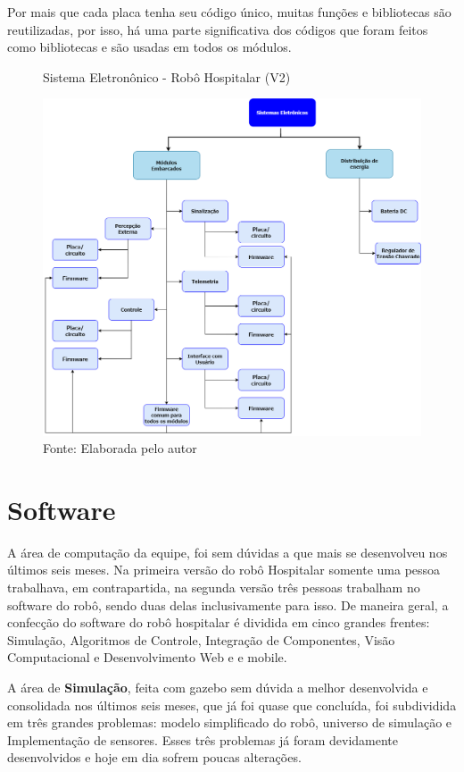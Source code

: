 \documentclass[../poliXuniversity_hospital_(USP)_report.tex]{subfiles}
\begin{document}
Por mais que cada placa tenha seu código único, muitas funções e bibliotecas são reutilizadas, por isso, há uma parte significativa dos códigos que foram feitos como bibliotecas e são usadas em todos os módulos.


\begin{figure}[h]
\centering
    \caption{Sistema Eletronônico - Robô Hospitalar (V2)}
    \centering %
    \includegraphics[width=17cm]{sistema_eletronico.png}
    \caption*{Fonte: Elaborada pelo autor}
    \label{figura:1° Versão Robô Hospitalar}
\end{figure}

\section{Software}

A área de computação da equipe, foi sem dúvidas a que mais se desenvolveu nos últimos seis meses. Na primeira versão do robô Hospitalar somente uma pessoa trabalhava, em contrapartida, na segunda versão três pessoas trabalham no software do robô, sendo duas delas inclusivamente para isso. De maneira geral, a confecção do software do robô hospitalar é dividida em cinco grandes frentes: Simulação, Algoritmos de Controle, Integração de Componentes, Visão Computacional e Desenvolvimento Web e  e mobile.

A área de \textbf{Simulação}, feita com gazebo \cite{gazebo21} sem dúvida a melhor desenvolvida e consolidada nos últimos seis meses, que já foi quase que concluída, foi subdividida em três grandes problemas: modelo simplificado do robô, universo de simulação e Implementação de sensores. Esses três problemas já foram devidamente desenvolvidos e hoje em dia sofrem poucas alterações.
\end{document}
